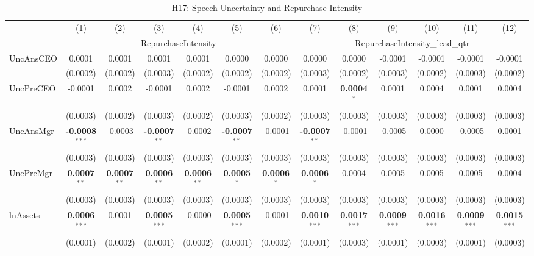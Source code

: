 \begin{landscape}
\begin{table}[H]
\setlength{\tabcolsep}{3pt}
\renewcommand{\arraystretch}{0.85}
\centering
\caption{H17: Speech Uncertainty and Repurchase Intensity}
\label{tab:h17}
\scriptsize
\begin{tabular}{lcccccccccccc}
\toprule
 & (1) & (2) & (3) & (4) & (5) & (6) & (7) & (8) & (9) & (10) & (11) & (12) \\
 & \multicolumn{6}{c}{RepurchaseIntensity} & \multicolumn{6}{c}{RepurchaseIntensity\_lead\_qtr} \\
\cmidrule(lr){2-7} \cmidrule(lr){8-13}
\midrule
UncAnsCEO & 0.0001 & 0.0001 & 0.0001 & 0.0001 & 0.0000 & 0.0000 & 0.0000 & 0.0000 & -0.0001 & -0.0001 & -0.0001 & -0.0001 \\
 & (0.0002) & (0.0002) & (0.0003) & (0.0002) & (0.0002) & (0.0002) & (0.0003) & (0.0002) & (0.0003) & (0.0002) & (0.0003) & (0.0002) \\
UncPreCEO & -0.0001 & 0.0002 & -0.0001 & 0.0002 & -0.0001 & 0.0002 & 0.0001 & \textbf{0.0004}$^{*}$ & 0.0001 & 0.0004 & 0.0001 & 0.0004 \\
 & (0.0003) & (0.0002) & (0.0003) & (0.0002) & (0.0003) & (0.0002) & (0.0003) & (0.0003) & (0.0003) & (0.0003) & (0.0003) & (0.0003) \\
UncAnsMgr & \textbf{-0.0008}$^{***}$ & -0.0003 & \textbf{-0.0007}$^{**}$ & -0.0002 & \textbf{-0.0007}$^{**}$ & -0.0001 & \textbf{-0.0007}$^{**}$ & -0.0001 & -0.0005 & 0.0000 & -0.0005 & 0.0001 \\
 & (0.0003) & (0.0003) & (0.0003) & (0.0003) & (0.0003) & (0.0003) & (0.0003) & (0.0003) & (0.0003) & (0.0003) & (0.0003) & (0.0003) \\
UncPreMgr & \textbf{0.0007}$^{**}$ & \textbf{0.0007}$^{**}$ & \textbf{0.0006}$^{**}$ & \textbf{0.0006}$^{**}$ & \textbf{0.0005}$^{*}$ & \textbf{0.0006}$^{*}$ & \textbf{0.0006}$^{*}$ & 0.0004 & 0.0005 & 0.0005 & 0.0005 & 0.0004 \\
 & (0.0003) & (0.0003) & (0.0003) & (0.0003) & (0.0003) & (0.0003) & (0.0003) & (0.0003) & (0.0003) & (0.0003) & (0.0003) & (0.0003) \\
\midrule
lnAssets & \textbf{0.0006}$^{***}$ & 0.0001 & \textbf{0.0005}$^{***}$ & -0.0000 & \textbf{0.0005}$^{***}$ & -0.0001 & \textbf{0.0010}$^{***}$ & \textbf{0.0017}$^{***}$ & \textbf{0.0009}$^{***}$ & \textbf{0.0016}$^{***}$ & \textbf{0.0009}$^{***}$ & \textbf{0.0015}$^{***}$ \\
 & (0.0001) & (0.0002) & (0.0001) & (0.0002) & (0.0001) & (0.0002) & (0.0001) & (0.0003) & (0.0001) & (0.0003) & (0.0001) & (0.0003) \\

\end{tabular}
\end{table}
\end{landscape}

